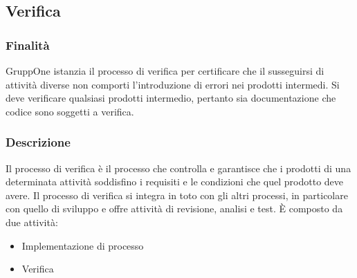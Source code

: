 \documentclass[../norme-di-progetto.tex]{subfiles}
\begin{document}
\subsection{Verifica}%
\label{sub:verifica}

\subsubsection{Finalità}%
\label{subs:verifica/finalita}

GruppOne istanzia il processo di verifica per certificare che il susseguirsi di attività diverse non comporti l'introduzione di errori nei prodotti intermedi.
Si deve verificare qualsiasi prodotti intermedio, pertanto sia documentazione che codice sono soggetti a verifica.

\subsubsection{Descrizione}%
\label{subs:verifica/descrizione}


Il processo di verifica è il processo che controlla e garantisce che i prodotti di una determinata attività soddisfino i requisiti e le condizioni che quel prodotto deve avere. Il processo di verifica si integra in toto con gli altri processi, in particolare con quello di sviluppo e offre attività di revisione, analisi e test. È composto da due attività:

\begin{itemize}
  \item Implementazione di processo
  \item Verifica
\end{itemize}
\end{document}
